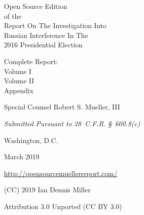 \thispagestyle{empty}

\begin{center}
\Huge
Open Source Edition \\
of the \\
Report On The Investigation Into \\
Russian Interference In The \\
2016 Presidential Election

\vspace{10 mm}

\large
Complete Report:\\
Volume I\\
Volume II\\
Appendix

\vspace{10 mm}

Special Counsel Robert S. Mueller, III

\vspace{10 mm}

\normalsize

\textit{Submitted Pursuant to 28~C.F.R. \S~600.8(c)}

\vspace{20 mm}

Washington, D.C.

\vspace{10 mm}

March 2019

\vspace{10 mm}

\large
\url{http://opensourcemuellerreport.com/}

\vspace{10 mm}

\normalsize
(CC) 2019 Ian Dennis Miller

Attribution 3.0 Unported (CC BY 3.0)

\end{center}

\newpage
